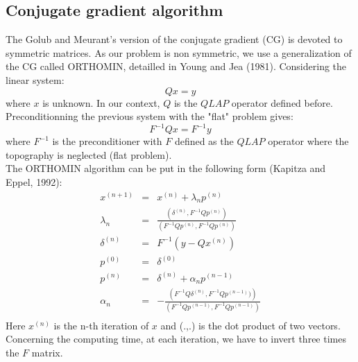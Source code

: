 \subsection{Conjugate gradient algorithm}
\par The Golub and Meurant's version of the conjugate gradient (CG) is devoted
to symmetric matrices. As our problem is non symmetric, we use a
generalization of the CG called ORTHOMIN, detailled in Young and Jea
(1981\nocite{you81}). Considering the linear system:
\begin{equation}
Qx = y
\end{equation}
where $x$ is unknown. In our context, $Q$ is the $QLAP$ operator defined before.
Preconditionning the previous system with the "flat" problem gives:
\begin{equation}
F^{-1} Q x = F^{-1} y
\end{equation}
where $F^{-1}$ is the preconditioner with $F$ defined as the $QLAP$ operator
where the topography is neglected (flat problem).\\
The ORTHOMIN algorithm can be put in the following form (Kapitza and Eppel,
1992\nocite{kap92}):
\begin{eqnarray*}
x^{(n+1)} &=& x^{(n)} + \lambda _n p^{(n)}\\
\lambda _n &=& \frac {(\delta^{(n)}, F^{-1} Q p^{(n)} )}
  { \left( F^{-1} Q p^{(n)}, F^{-1} Q p^{(n)} \right) } \\
\delta^{(n)} &=& F^{-1} ( y - Q x^{(n)}) \\
p^{(0)} &=& \delta^{(0)}\\
p^{(n)} &=& \delta^{(n)} + \alpha _n p^{(n-1)} \\
\alpha _n &=& - \frac {\left( F^{-1} Q \delta^{(n)},  F^{-1} Q p^{(n-1)} )
\right)} {\left( F^{-1} Q p^{(n-1)}, F^{-1} Q p^{(n-1)} \right)} \\
\end{eqnarray*}
Here $x^{(n)}$ is the n-th iteration of $x$ and (.,.) is the dot product of two
vectors. Concerning the computing time, at each iteration, we have to
invert three times the $F$ matrix.
\\

